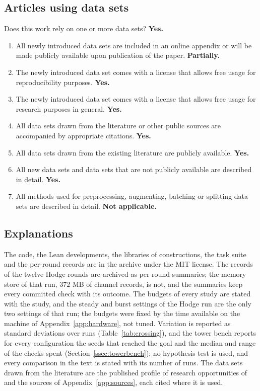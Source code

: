 \subsection*{Articles using data sets}

Does this work rely on one or more data sets? \textbf{Yes.}

\begin{enumerate}[leftmargin=1.8em,itemsep=1pt]
\item All newly introduced data sets are included in an online appendix or will be made publicly available upon publication of the paper. \textbf{Partially.}
\item The newly introduced data set comes with a license that allows free usage for reproducibility purposes. \textbf{Yes.}
\item The newly introduced data set comes with a license that allows free usage for research purposes in general. \textbf{Yes.}
\item All data sets drawn from the literature or other public sources are accompanied by appropriate citations. \textbf{Yes.}
\item All data sets drawn from the existing literature are publicly available. \textbf{Yes.}
\item All new data sets and data sets that are not publicly available are described in detail. \textbf{Yes.}
\item All methods used for preprocessing, augmenting, batching or splitting data sets are described in detail. \textbf{Not applicable.}
\end{enumerate}

\subsection*{Explanations}

The code, the Lean developments, the libraries of constructions, the task suite and the per-round records are in the archive \cite{Bha26c} under the MIT license. The records of the twelve Hodge rounds are archived as per-round summaries; the memory store of that run, $372$ MB of channel records, is not, and the summaries keep every committed check with its outcome. The budgets of every study are stated with the study, and the steady and burst settings of the Hodge run are the only two settings of that run; the budgets were fixed by the time available on the machine of Appendix~\ref{app:hardware}, not tuned. Variation is reported as standard deviations over runs (Table~\ref{tab:crossing}), and the tower bench reports for every configuration the seeds that reached the goal and the median and range of the checks spent (Section~\ref{ssec:towerbench}); no hypothesis test is used, and every comparison in the text is stated with its number of runs. The data sets drawn from the literature are the published profile of research opportunities of \cite{CZC26} and the sources of Appendix~\ref{app:sources}, each cited where it is used.
